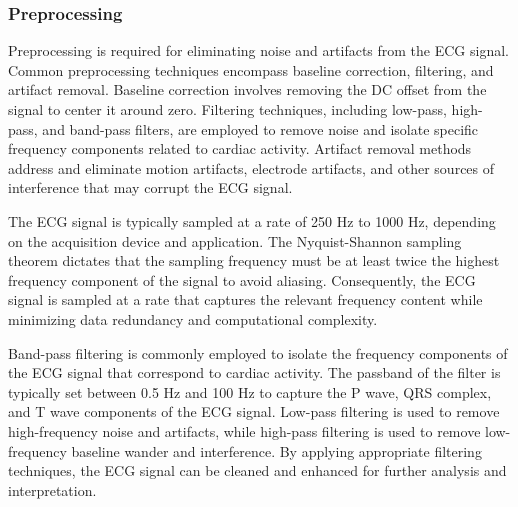 \documentclass{zc-ust-hw}
\begin{document}
\subsubsection{Preprocessing}

Preprocessing is required for eliminating noise and artifacts from the ECG
signal. Common preprocessing techniques encompass baseline correction,
filtering, and artifact removal. Baseline correction involves removing the DC
offset from the signal to center it around zero. Filtering techniques,
including low-pass, high-pass, and band-pass filters, are employed to remove
noise and isolate specific frequency components related to cardiac activity.
Artifact removal methods address and eliminate motion artifacts, electrode
artifacts, and other sources of interference that may corrupt the ECG signal.
\cite{hglinger_2016_ecg}

The ECG signal is typically sampled at a rate of 250 Hz to 1000 Hz, depending
on the acquisition device and application. The Nyquist-Shannon sampling theorem
dictates that the sampling frequency must be at least twice the highest
frequency component of the signal to avoid aliasing. Consequently, the ECG
signal is sampled at a rate that captures the relevant frequency content while
minimizing data redundancy and computational complexity.
\cite{hglinger_2016_ecg}

Band-pass filtering is commonly employed to isolate the frequency components of
the ECG signal that correspond to cardiac activity. The passband of the filter
is typically set between 0.5 Hz and 100 Hz to capture the P wave, QRS complex,
and T wave components of the ECG signal. Low-pass filtering is used to remove
high-frequency noise and artifacts, while high-pass filtering is used to remove
low-frequency baseline wander and interference. By applying appropriate
filtering techniques, the ECG signal can be cleaned and enhanced for further
analysis and interpretation. \cite{marchon2019efficient}
\end{document}
